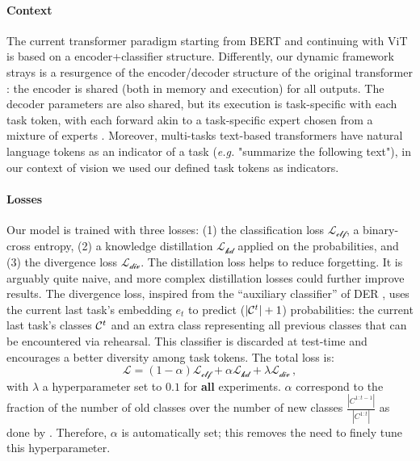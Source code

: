 \vspace{-1em}
\paragraph{Context} The current transformer paradigm starting from BERT \citep{devlin2018bert} and
continuing with ViT \citep{dosovitskiy2020vit} is based on a encoder+classifier structure.
Differently, our dynamic framework strays is a resurgence of the encoder/decoder structure of the
original transformer \citep{vaswani2017transformer}: the encoder is shared (both in memory and
execution) for all outputs. The decoder parameters are also shared, but its execution is
task-specific with each task token, with each forward akin to a task-specific expert chosen from a
mixture of experts \citep{masoudnia2014mixture}. Moreover, multi-tasks text-based transformers have
natural language tokens as an indicator of a task \citep{raffel2019t5} (\textit{e.g.} "summarize the
following text"), in our context of vision we used our defined task tokens as indicators.

\label{sec:dytox_training}

\vspace{-0.5em}
\paragraph{Losses} Our model is trained with three losses: (1) the classification loss
$\mathcal{L_\text{clf}}$, a binary-cross entropy, (2) a knowledge distillation
\citep{hinton2015knowledge_distillation} $\mathcal{L_\text{kd}}$ applied on the probabilities, and
(3) the divergence loss $\mathcal{L_\text{div}}$. The distillation loss helps to reduce forgetting.
It is arguably quite naive, and more complex distillation losses
\citep{selvaraju2017gradcam,hou2019ucir,douillard2020podnet} could further improve results. The
divergence loss, inspired from the ``auxiliary classifier'' of DER \citep{yan2021der}, uses the
current last task's embedding $e_t$ to predict ($|\mathcal{C}^t| + 1$) probabilities: the current last
task's classes $\mathcal{C}^t$ and an extra class representing all previous classes that can be encountered
via rehearsal. This classifier is discarded at test-time and encourages a better diversity among
task tokens. The total loss is:
%
\begin{equation}
    \mathcal{L} = (1 - \alpha) \mathcal{L_\text{clf}} + \alpha \mathcal{L_\text{kd}} + \lambda \mathcal{L_\text{div}}\,,
    \label{eq:dytox_final_loss}
\end{equation}
%
with $\lambda$ a hyperparameter set to $0.1$ for \textbf{all} experiments. $\alpha$ correspond to
the fraction of the number of old classes over the number of new classes
$\frac{|C^{1:t-1}|}{|C^{1:t}|}$ as done by \citep{zhao2020weightalignement}. Therefore, $\alpha$ is
automatically set; this removes the need to finely tune this hyperparameter.


